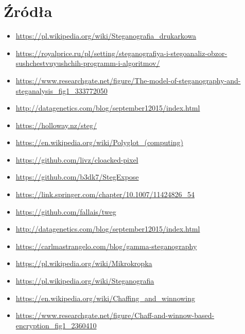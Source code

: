 \documentclass{article}
\begin{document}
\section{Źródła}
\begin{itemize}
	\item \url{https://pl.wikipedia.org/wiki/Steganografia_drukarkowa}
	\item \url{https://royalprice.ru/pl/setting/steganografiya-i-stegoanaliz-obzor-sushchestvuyushchih-programm-i-algoritmov/}
	\item \url{https://www.researchgate.net/figure/The-model-of-steganography-and-steganalysis_fig1_333772050}
	\item \url{http://datagenetics.com/blog/september12015/index.html}
	\item \url{https://holloway.nz/steg/}
	\item \url{https://en.wikipedia.org/wiki/Polyglot_(computing)}
	\item \url{https://github.com/livz/cloacked-pixel}
	\item \url{https://github.com/b3dk7/StegExpose}
	\item \url{https://link.springer.com/chapter/10.1007/11424826_54}
	\item \url{https://github.com/fallais/tweg}
	\item \url{http://datagenetics.com/blog/september12015/index.html}
	\item \url{https://carlmastrangelo.com/blog/gamma-steganography}
	\item \url{https://pl.wikipedia.org/wiki/Mikrokropka}
	\item \url{https://pl.wikipedia.org/wiki/Steganografia}
	\item \url{https://en.wikipedia.org/wiki/Chaffing_and_winnowing}
	\item \url{https://www.researchgate.net/figure/Chaff-and-winnow-based-encryption_fig1_2360410}
\end{itemize}
\end{document}
